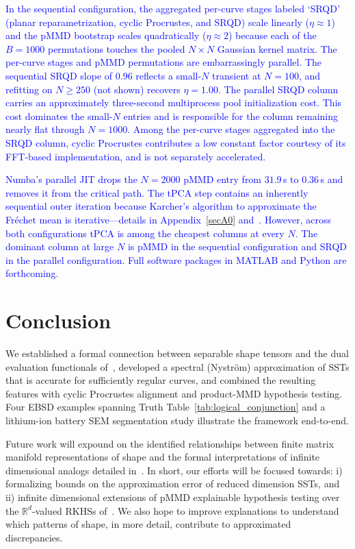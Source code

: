 \documentclass[pdflatex,iicol]{sn-jnl}%
\theoremstyle{thmstyleone}%
\theoremstyle{thmstyletwo}%
\theoremstyle{thmstylethree}%
\begin{document}
\textcolor{blue}{In the sequential configuration, the aggregated per-curve stages labeled `SRQD' (planar reparametrization, cyclic Procrustes, and SRQD) scale linearly ($\eta\approx 1$) and the pMMD bootstrap scales quadratically ($\eta\approx 2$) because each of the $B=1000$ permutations touches the pooled $N\times N$ Gaussian kernel matrix. The per-curve stages and pMMD permutations are embarrassingly parallel. The sequential SRQD slope of $0.96$ reflects a small-$N$ transient at $N=100$, and refitting on $N \geq 250$ (not shown) recovers $\eta = 1.00$. The parallel SRQD column carries an approximately three-second multiprocess pool initialization cost. This cost dominates the small-$N$ entries and is responsible for the column remaining nearly flat through $N=1000$. Among the per-curve stages aggregated into the SRQD column, cyclic Procrustes contributes a low constant factor courtesy of its FFT-based implementation, and is not separately accelerated.}

\textcolor{blue}{Numba's parallel JIT drops the $N=2000$ pMMD entry from $31.9$\,s to $0.36$\,s and removes it from the critical path. The tPCA step contains an inherently sequential outer iteration because Karcher's algorithm to approximate the Fr\'echet mean is iterative---details in Appendix~\ref{secA0} and~\cite{grey2023separable}. However, across both configurations tPCA is among the cheapest columns at every $N$. The dominant column at large $N$ is pMMD in the sequential configuration and SRQD in the parallel configuration. Full software packages in MATLAB and Python are forthcoming.}

\section{Conclusion}\label{sec:conclude}
We established a formal connection between separable shape tensors and the dual evaluation functionals of~\cite{micheli2013matrix}, developed a spectral (Nystr\"om) approximation of SSTs that is accurate for sufficiently regular curves, and combined the resulting features with cyclic Procrustes alignment and product-MMD hypothesis testing. Four EBSD examples spanning Truth Table~\ref{tab:logical_conjunction} and a lithium-ion battery SEM segmentation study illustrate the framework end-to-end.

Future work will expound on the identified relationships between finite matrix manifold representations of shape and the formal interpretations of infinite dimensional analogs detailed in~\cite{micheli2013matrix}. In short, our efforts will be focused towards: i) formalizing bounds on the approximation error of reduced dimension SSTs, and ii) infinite dimensional extensions of pMMD explainable hypothesis testing over the $\mathbb{R}^d$-valued RKHSs of~\cite{micheli2013matrix}. We also hope to improve explanations to understand which patterns of shape, in more detail, contribute to approximated discrepancies.
\end{document}
